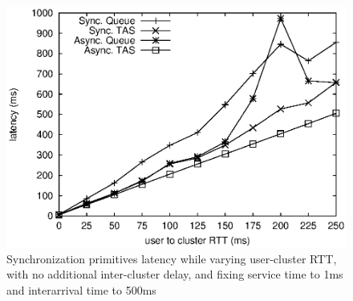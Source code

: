 \begin{figure}[h]
\centering
\includegraphics[scale=0.72]{img/primitives_fixClusterLatency-0.eps}
\caption{Synchronization primitives latency while varying user-cluster RTT, with no additional inter-cluster delay, and fixing service time to 1ms and interarrival time to 500ms}
\label{fig:primitives_vary_delay}
\end{figure}


